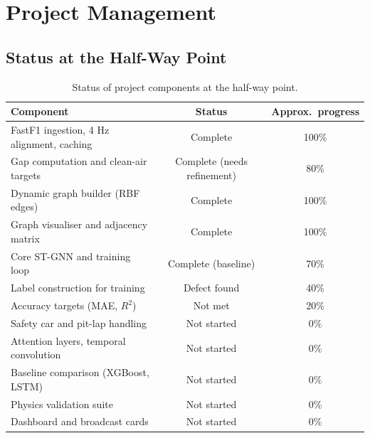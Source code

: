 \documentclass[11pt,a4paper]{article}
\begin{document}
\section{Project Management}
\label{sec:pm}
\subsection{Status at the Half-Way Point}
\begin{table}[H]
\centering
\caption{Status of project components at the half-way point.}
\label{tab:status}
\small
\begin{tabularx}{\linewidth}{@{}Xcc@{}}
\toprule
\textbf{Component} & \textbf{Status} & \textbf{Approx.\ progress} \\
\midrule
FastF1 ingestion, 4 Hz alignment, caching & Complete & 100\% \\
Gap computation and clean-air targets & Complete (needs refinement) & 80\% \\
Dynamic graph builder (RBF edges) & Complete & 100\% \\
Graph visualiser and adjacency matrix & Complete & 100\% \\
Core ST-GNN and training loop & Complete (baseline) & 70\% \\
Label construction for training & Defect found & 40\% \\
Accuracy targets (MAE, $R^2$) & Not met & 20\% \\
Safety car and pit-lap handling & Not started & 0\% \\
Attention layers, temporal convolution & Not started & 0\% \\
Baseline comparison (XGBoost, LSTM) & Not started & 0\% \\
Physics validation suite & Not started & 0\% \\
Dashboard and broadcast cards & Not started & 0\% \\
\bottomrule
\end{tabularx}
\end{table}
\end{document}
